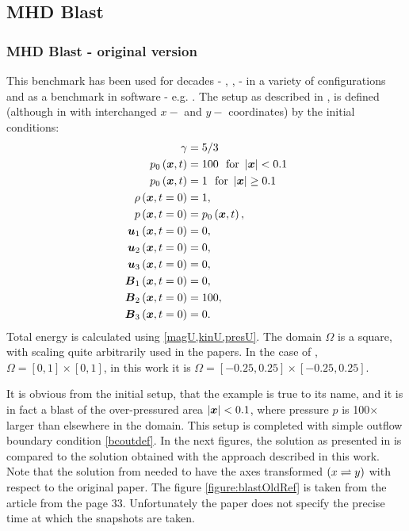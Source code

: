 \subsection{MHD Blast}
\subsubsection{MHD Blast - original version}
This benchmark has been used for decades - \cite{blast0}, \cite{blast1}, \cite{blast2} - in a variety of configurations and as a benchmark in software - e.g. \citep{athena}. The setup as described in \cite{blast0}, \cite{blast1} is defined (although in \cite{blast1} with interchanged $x-$ and $y-$ coordinates) by the initial conditions:
\begin{align}
\label{mhdBlastOld}
\gamma & =  5 / 3\\ \nonumber
p_0\left(\mbox{\boldmath $x$}, t\right) & =  100\ \ \text{for}\ \left|\mbox{\boldmath $x$}\right| < 0.1\\ \nonumber
p_0\left(\mbox{\boldmath $x$}, t\right) & =  1\ \ \text{for}\ \left|\mbox{\boldmath $x$}\right| \geq 0.1\\ \nonumber
\rho\left(\mbox{\boldmath $x$}, t = 0\right) & =  1,\\ \nonumber
p\left(\mbox{\boldmath $x$}, t = 0\right) & =  p_0\left(\mbox{\boldmath $x$}, t\right),\\ \nonumber
\mbox{\boldmath $u$}_1\left(\mbox{\boldmath $x$}, t = 0\right) & =  0,\\ \nonumber
\mbox{\boldmath $u$}_2\left(\mbox{\boldmath $x$}, t = 0\right) & =  0,\\ \nonumber
\mbox{\boldmath $u$}_3\left(\mbox{\boldmath $x$}, t = 0\right) & =  0,\\ \nonumber
\mbox{\boldmath $B$}_1\left(\mbox{\boldmath $x$}, t = 0\right) & =  0,\\ \nonumber
\mbox{\boldmath $B$}_2\left(\mbox{\boldmath $x$}, t = 0\right) & =  100,\\ \nonumber
\mbox{\boldmath $B$}_3\left(\mbox{\boldmath $x$}, t = 0\right) & =  0.
\end{align}
Total energy is calculated using \cref{magU,kinU,presU}.
The domain $\Omega$ is a square, with scaling quite arbitrarily used in the papers. In the case of \cite{blast1}, $\Omega = [0, 1] \times [0, 1]$, in this work it is $\Omega = [-0.25, 0.25] \times [-0.25, 0.25]$.

It is obvious from the initial setup, that the example is true to its name, and it is in fact a blast of the over-pressured area $\left|\mbox{\boldmath $x$}\right| < 0.1$, where pressure $p$ is 100$\times$ larger than elsewhere in the domain. This setup is completed with simple outflow boundary condition \cref{bcoutdef}.
In the next figures, the solution as presented in \cite{blast1} is compared to the solution obtained with the approach described in this work. Note that the solution from \cite{blast1} needed to have the axes transformed $\left( x\rightleftharpoons y\right)$ with respect to the original paper. The figure \cref{figure:blastOldRef} is taken from the article \cite{blast1} from the page 33. Unfortunately the paper does not specify the precise time at which the snapshots are taken.

